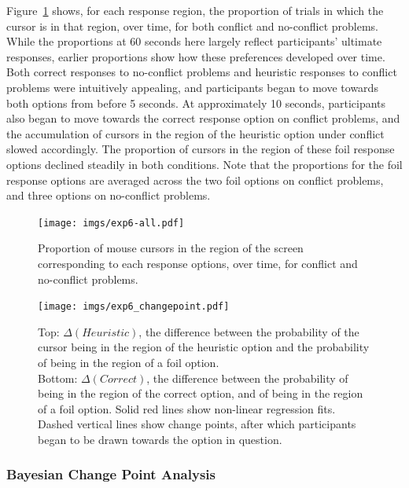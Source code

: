 Figure~\ref{fig:exp6-all} shows, for each response region, 
the proportion of trials in which the cursor is in that region, over time,
for both conflict and no-conflict problems. 
While the proportions at 60 seconds here 
largely reflect participants' ultimate responses, 
earlier proportions show how these preferences developed over time. 
Both correct responses to no-conflict problems and 
heuristic responses to conflict problems
were intuitively appealing, and participants 
began to move towards both options from before 5 seconds.
At approximately 10 seconds, participants also began to move towards
the correct response option on conflict problems,
and the accumulation of cursors in the region 
of the heuristic option under conflict slowed accordingly. 
The proportion of cursors in the region of these foil response options 
declined steadily in both conditions. 
Note that the proportions for the foil response options 
are averaged across the two foil options on conflict problems, 
and three options on no-conflict problems.

\begin{figure}[hp]
  \centering
  \texttt{[image: imgs/exp6-all.pdf]}
  \caption[Proportion of mouse cursors each region of the screen over time, Experiment 6.]{
    \label{fig:exp6-all}
    Proportion of mouse cursors in the region of the screen 
    corresponding to each response options, over time, 
    for conflict and no-conflict problems.    
  }
\end{figure}

\begin{figure}[bp]
  \centering
  \texttt{[image: imgs/exp6\_changepoint.pdf]}
  \caption[Change point analysis, Experiment 6.]{
    \label{fig:exp6_changepoint}
    Top: $\Delta (Heuristic)$, the difference between
    the probability of the cursor being in the region of the heuristic option
    and the probability of being in the region of a foil option.\\
    Bottom: $\Delta (Correct)$, the difference between
    the probability of being in the region of the correct option,
    and of being in the region of a foil option.
    Solid red lines show non-linear regression fits.
    Dashed vertical lines show change points,
    after which participants began to be drawn towards the option in question.
  }
\end{figure}

\subsubsection{Bayesian Change Point Analysis}


